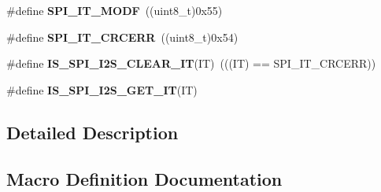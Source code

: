 \begin{DoxyCompactItemize}
\item 
\hypertarget{group___s_p_i___i2_s__interrupts__definition_ga0b9780d5f31fd80f4d0fa7d6860041e9}{}\#define {\bfseries S\+P\+I\+\_\+\+I\+T\+\_\+\+M\+O\+D\+F}~((uint8\+\_\+t)0x55)\label{group___s_p_i___i2_s__interrupts__definition_ga0b9780d5f31fd80f4d0fa7d6860041e9}

\item 
\hypertarget{group___s_p_i___i2_s__interrupts__definition_ga9aa97a5ce8d3500dc14ca4e30eada199}{}\#define {\bfseries S\+P\+I\+\_\+\+I\+T\+\_\+\+C\+R\+C\+E\+R\+R}~((uint8\+\_\+t)0x54)\label{group___s_p_i___i2_s__interrupts__definition_ga9aa97a5ce8d3500dc14ca4e30eada199}

\item 
\hypertarget{group___s_p_i___i2_s__interrupts__definition_gabeb917a0a708af0439f753a5f4af4c5e}{}\#define {\bfseries I\+S\+\_\+\+S\+P\+I\+\_\+\+I2\+S\+\_\+\+C\+L\+E\+A\+R\+\_\+\+I\+T}(I\+T)~(((I\+T) == S\+P\+I\+\_\+\+I\+T\+\_\+\+C\+R\+C\+E\+R\+R))\label{group___s_p_i___i2_s__interrupts__definition_gabeb917a0a708af0439f753a5f4af4c5e}

\item 
\#define {\bfseries I\+S\+\_\+\+S\+P\+I\+\_\+\+I2\+S\+\_\+\+G\+E\+T\+\_\+\+I\+T}(I\+T)
\end{DoxyCompactItemize}


\subsection{Detailed Description}


\subsection{Macro Definition Documentation}
\hypertarget{group___s_p_i___i2_s__interrupts__definition_ga3ec2f6950d7ff801f992e65593c3365e}{}
